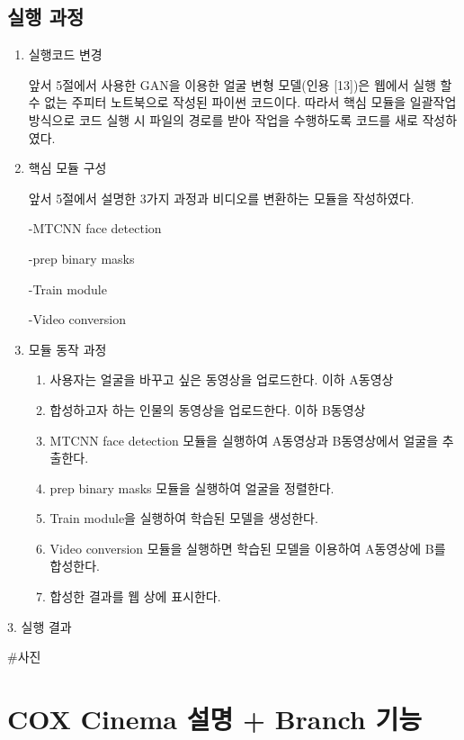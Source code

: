 \documentclass{oblivoir}
\begin{document}
\subsection{실행 과정}
\begin{enumerate}[가. ]
    
 \item 실행코드 변경

  앞서 5절에서 사용한 GAN을 이용한 얼굴 변형 모델(인용 [13])은 웹에서 실행 할 수 없는 주피터 노트북으로 작성된 파이썬 코드이다. 따라서 핵심 모듈을 일괄작업 방식으로 코드 실행 시 파일의 경로를 받아 작업을 수행하도록 코드를 새로 작성하였다.

  \item 핵심 모듈 구성

  앞서 5절에서 설명한 3가지 과정과 비디오를 변환하는 모듈을 작성하였다.

  -MTCNN face detection

  -prep binary masks

  -Train module

  -Video conversion

  \item 모듈 동작 과정
\begin{enumerate}
    \item  사용자는 얼굴을 바꾸고 싶은 동영상을 업로드한다. 이하 A동영상
    \item 합성하고자 하는 인물의 동영상을 업로드한다. 이하 B동영상
    \item MTCNN face detection 모듈을 실행하여 A동영상과 B동영상에서 얼굴을 추출한다.
    \item prep binary masks 모듈을 실행하여 얼굴을 정렬한다.
    \item Train module을 실행하여 학습된 모델을 생성한다.
    \item Video conversion 모듈을 실행하면 학습된 모델을 이용하여 A동영상에 B를 합성한다.
    \item 합성한 결과를 웹 상에 표시한다.
\end{enumerate}
   
\end{enumerate}
3. 실행 결과

#사진


\section{ COX Cinema 설명 + Branch 기능}
\end{document}
